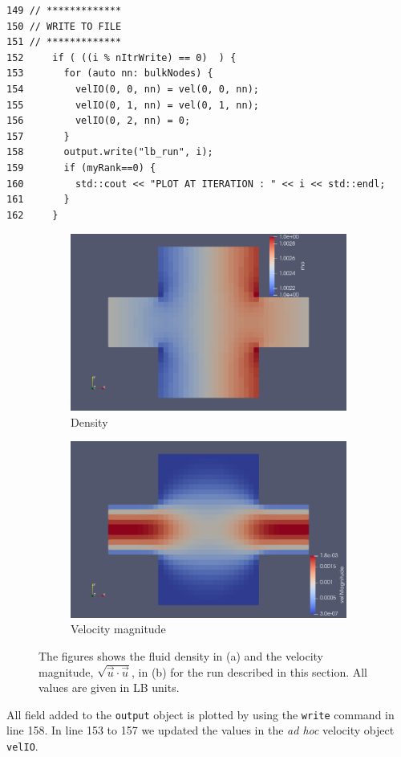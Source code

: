 \documentclass[11pt,a4paper]{report}
\begin{document}
\begin{verbatim}
149 // *************
150 // WRITE TO FILE
151 // *************
152     if ( ((i % nItrWrite) == 0)  ) {
153       for (auto nn: bulkNodes) {
154         velIO(0, 0, nn) = vel(0, 0, nn);
155         velIO(0, 1, nn) = vel(0, 1, nn);
156         velIO(0, 2, nn) = 0;
157       }
158       output.write("lb_run", i);
159       if (myRank==0) {
160         std::cout << "PLOT AT ITERATION : " << i << std::endl;
161       }
162     }
\end{verbatim}
\begin{figure}[h]
	\begin{subfigure}{0.40\textwidth}
		\includegraphics[width=1.2\textwidth]{./Figures/std_case_run_rho.png}
		\caption{Density}
	\end{subfigure}
	\begin{subfigure}{0.40\textwidth}
		\includegraphics[width=1.2\textwidth]{./Figures/std_case_run_vel.png}
		\caption{Velocity magnitude}
	\end{subfigure}	
	\caption{The figures shows the fluid density in (a) and the velocity magnitude, $\sqrt{\vec{u}\cdot\vec{u}}$, in (b) for the run described in this section. All values are given in LB units.}
	\label{fig:std_case rho vel}
\end{figure}   All field added to the \texttt{output} object is plotted by using the \texttt{write} command in line 158. In line 153 to 157 we updated the values in the \emph{ad hoc} velocity object \texttt{velIO}.
\end{document}
